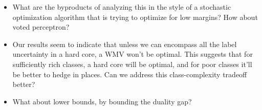 \documentclass{colt2015} %
\newcommand{\vF}{\mathbf{F}}
\newcommand{\vb}{\mathbf{b}}
\newcommand{\vg}{\mathbf{g}}
\newcommand{\vz}{\mathbf{z}}
\newcommand{\abs}[1]{\left| #1 \right|}
\newcommand{\cH}{\mathcal{H}}
\newcommand{\cX}{\mathcal{X}}
\newcommand{\cD}{\mathcal{D}}
\begin{document}
{\begin{itemize}
some classifiers can be specialists / have false-positive constraints and others can be unrestricted. 
There is no difficulty in adapting to this with the same techniques and strength of guarantees. 
\item 
What are the byproducts of analyzing this in the style of a stochastic optimization algorithm 
that is trying to optimize for low margins? How about voted perceptron?
\item 
Our results seem to indicate that unless we can encompass all the label uncertainty in a hard core, 
a WMV won't be optimal. This suggests that for sufficiently rich classes, a hard core will be optimal, 
and for poor classes it'll be better to hedge in places. Can we address this class-complexity tradeoff better? 
\item
What about lower bounds, by bounding the duality gap?
\end{itemize}
}
\fi




\end{document}
